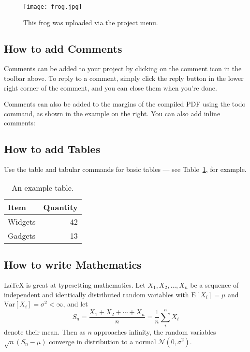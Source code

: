 \documentclass[a4paper]{article}
\begin{document}
\begin{figure}
\centering
\texttt{[image: frog.jpg]}
\caption{\label{fig:frog}This frog was uploaded via the project menu.}
\end{figure}

\subsection{How to add Comments}

Comments can be added to your project by clicking on the comment icon in the toolbar above. %
%
%
To reply to a comment, simply click the reply button in the lower right corner of the comment, and you can close them when you're done.

Comments can also be added to the margins of the compiled PDF using the todo command, as shown in the example on the right. You can also add inline comments:


\subsection{How to add Tables}

Use the table and tabular commands for basic tables --- see Table~\ref{tab:widgets}, for example. 

\begin{table}
\centering
\begin{tabular}{l|r}
Item & Quantity \\\hline
Widgets & 42 \\
Gadgets & 13
\end{tabular}
\caption{\label{tab:widgets}An example table.}
\end{table}

\subsection{How to write Mathematics}

\LaTeX{} is great at typesetting mathematics. Let $X_1, X_2, \ldots, X_n$ be a sequence of independent and identically distributed random variables with $\text{E}[X_i] = \mu$ and $\text{Var}[X_i] = \sigma^2 < \infty$, and let
\[S_n = \frac{X_1 + X_2 + \cdots + X_n}{n}
      = \frac{1}{n}\sum_{i}^{n} X_i\]
denote their mean. Then as $n$ approaches infinity, the random variables $\sqrt{n}(S_n - \mu)$ converge in distribution to a normal $\mathcal{N}(0, \sigma^2)$.
\end{document}
